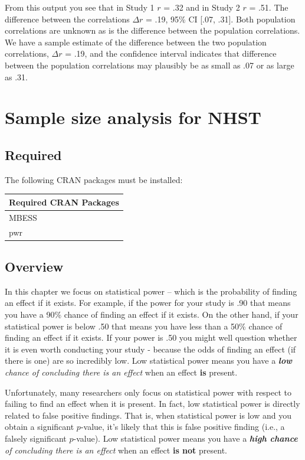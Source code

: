 \documentclass[
]{krantz}
\begin{document}
From this output you see that in Study 1 \(r\) = .32 and in Study 2 \(r\) = .51. The difference between the correlations \(\Delta r\) = .19, 95\% CI {[}.07, .31{]}. Both population correlations are unknown as is the difference between the population correlations. We have a sample estimate of the difference between the two population correlations, \(\Delta r\) = .19, and the confidence interval indicates that difference between the population correlations may plausibly be as small as .07 or as large as .31.

\hypertarget{sample-size-analysis-for-nhst}{%
\chapter{Sample size analysis for NHST}\label{sample-size-analysis-for-nhst}}

\hypertarget{required-3}{%
\section{Required}\label{required-3}}

The following CRAN packages must be installed:

\begin{longtable}[]{@{}l@{}}
\toprule
Required CRAN Packages\tabularnewline
\midrule
\endhead
MBESS\tabularnewline
pwr\tabularnewline
\bottomrule
\end{longtable}

\hypertarget{overview-3}{%
\section{Overview}\label{overview-3}}

In this chapter we focus on statistical power -- which is the probability of finding an effect if it exists. For example, if the power for your study is .90 that means you have a 90\% chance of finding an effect if it exists. On the other hand, if your statistical power is below .50 that means you have less than a 50\% chance of finding an effect if it exists. If your power is .50 you might well question whether it is even worth conducting your study - because the odds of finding an effect (if there is one) are so incredibly low. Low statistical power means you have a \emph{\textbf{low} chance of concluding there is an effect} when an effect \textbf{is} present.

Unfortunately, many researchers only focus on statistical power with respect to failing to find an effect when it is present. In fact, low statistical power is directly related to false positive findings. That is, when statistical power is low and you obtain a significant \(p\)-value, it's likely that this is false positive finding (i.e., a falsely significant \(p\)-value). Low statistical power means you have a \emph{\textbf{high chance} of concluding there is an effect} when an effect \textbf{is not} present.
\end{document}
